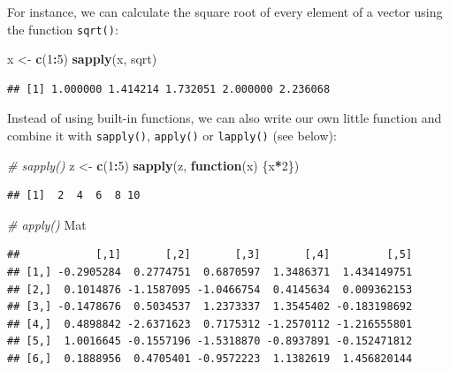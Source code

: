 \documentclass[
]{book}
\newenvironment{Shaded}{\begin{snugshade}}{\end{snugshade}}
\newcommand{\CommentTok}[1]{\textcolor[rgb]{0.56,0.35,0.01}{\textit{#1}}}
\newcommand{\ControlFlowTok}[1]{\textcolor[rgb]{0.13,0.29,0.53}{\textbf{#1}}}
\newcommand{\DecValTok}[1]{\textcolor[rgb]{0.00,0.00,0.81}{#1}}
\newcommand{\FunctionTok}[1]{\textcolor[rgb]{0.13,0.29,0.53}{\textbf{#1}}}
\newcommand{\NormalTok}[1]{#1}
\newcommand{\OtherTok}[1]{\textcolor[rgb]{0.56,0.35,0.01}{#1}}
\newcommand{\SpecialCharTok}[1]{\textcolor[rgb]{0.81,0.36,0.00}{\textbf{#1}}}
\begin{document}
For instance, we can calculate the square root of every element of a vector using the function \texttt{sqrt()}:

\begin{Shaded}
\begin{Highlighting}[]
\NormalTok{x }\OtherTok{\textless{}{-}} \FunctionTok{c}\NormalTok{(}\DecValTok{1}\SpecialCharTok{:}\DecValTok{5}\NormalTok{)}
\FunctionTok{sapply}\NormalTok{(x, sqrt)}
\end{Highlighting}
\end{Shaded}

\begin{verbatim}
## [1] 1.000000 1.414214 1.732051 2.000000 2.236068
\end{verbatim}

Instead of using built-in functions, we can also write our own little function and combine it with \texttt{sapply()}, \texttt{apply()} or \texttt{lapply()} (see below):

\begin{Shaded}
\begin{Highlighting}[]
\CommentTok{\# sapply()}
\NormalTok{z }\OtherTok{\textless{}{-}} \FunctionTok{c}\NormalTok{(}\DecValTok{1}\SpecialCharTok{:}\DecValTok{5}\NormalTok{)}
\FunctionTok{sapply}\NormalTok{(z, }\ControlFlowTok{function}\NormalTok{(x) \{x}\SpecialCharTok{*}\DecValTok{2}\NormalTok{\}) }
\end{Highlighting}
\end{Shaded}

\begin{verbatim}
## [1]  2  4  6  8 10
\end{verbatim}

\begin{Shaded}
\begin{Highlighting}[]
\CommentTok{\# apply()}
\NormalTok{Mat }
\end{Highlighting}
\end{Shaded}

\begin{verbatim}
##            [,1]       [,2]       [,3]       [,4]         [,5]
## [1,] -0.2905284  0.2774751  0.6870597  1.3486371  1.434149751
## [2,]  0.1014876 -1.1587095 -1.0466754  0.4145634  0.009362153
## [3,] -0.1478676  0.5034537  1.2373337  1.3545402 -0.183198692
## [4,]  0.4898842 -2.6371623  0.7175312 -1.2570112 -1.216555801
## [5,]  1.0016645 -0.1557196 -1.5318870 -0.8937891 -0.152471812
## [6,]  0.1888956  0.4705401 -0.9572223  1.1382619  1.456820144
\end{verbatim}
\end{document}
